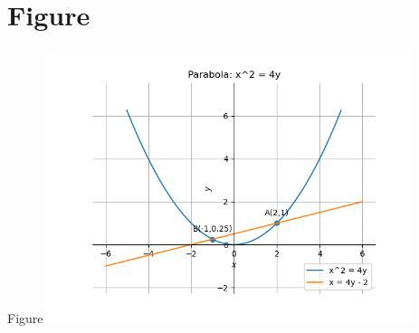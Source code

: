 \documentclass{beamer}
\theoremstyle{remark}
\numberwithin{equation}{section}
\begin{document}
\section{Figure}
\begin{frame}{Figure}
\includegraphics[width=0.8\textwidth]{figs/plot.png}
\end{frame}
\end{document}
